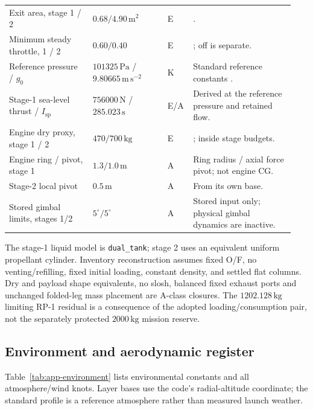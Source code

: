 \begin{longtable}{@{}>{\raggedright\arraybackslash}p{0.29\linewidth}>{\raggedright\arraybackslash}p{0.25\linewidth}>{\raggedright\arraybackslash}p{0.06\linewidth}>{\raggedright\arraybackslash}p{0.34\linewidth}@{}}
Exit area, stage 1 / 2 & $0.68/4.90\,\mathrm{m^2}$ & E & \cite[Table 2.16]{pezent2024}. \\
Minimum steady throttle, 1 / 2 & $0.60/0.40$ & E & \cite[Table 2.16]{pezent2024}; off is separate. \\
Reference pressure / $g_0$ & $101325\,\mathrm{Pa}$ / $9.80665\,\mathrm{m\,s^{-2}}$ & K & Standard reference constants \cite{ussa1976}. \\
Stage-1 sea-level thrust / $I_{\mathrm{sp}}$ & $756000\,\mathrm{N}$ / $285.023\,\mathrm{s}$ & E/A & Derived at the reference pressure and retained flow. \\
Engine dry proxy, stage 1 / 2 & $470/700\,\mathrm{kg}$ & E & \cite[Table 2]{bykerk2023}; inside stage budgets. \\
Engine ring / pivot, stage 1 & $1.3/1.0\,\mathrm{m}$ & A & Ring radius / axial force pivot; not engine CG. \\
Stage-2 local pivot & $0.5\,\mathrm{m}$ & A & From its own base. \\
Stored gimbal limits, stages 1/2 & $5^\circ/5^\circ$ & A & Stored input only; physical gimbal dynamics are inactive. \\
\end{longtable}\endgroup

The stage-1 liquid model is \texttt{dual\_tank}; stage 2 uses an equivalent uniform propellant cylinder. Inventory reconstruction assumes fixed O/F, no venting/refilling, fixed initial loading, constant density, and settled flat columns. Dry and payload shape equivalents, no slosh, balanced fixed exhaust ports and unchanged folded-leg mass placement are A-class closures. The $1202.128\,\mathrm{kg}$ limiting RP-1 residual is a consequence of the adopted loading/consumption pair, not the separately protected $2000\,\mathrm{kg}$ mission reserve.

\subsection{Environment and aerodynamic register}
Table~\ref{tab:app-environment} lists environmental constants and all atmosphere/wind knots. Layer bases use the code's radial-altitude coordinate; the standard profile is a reference atmosphere rather than measured launch weather.

